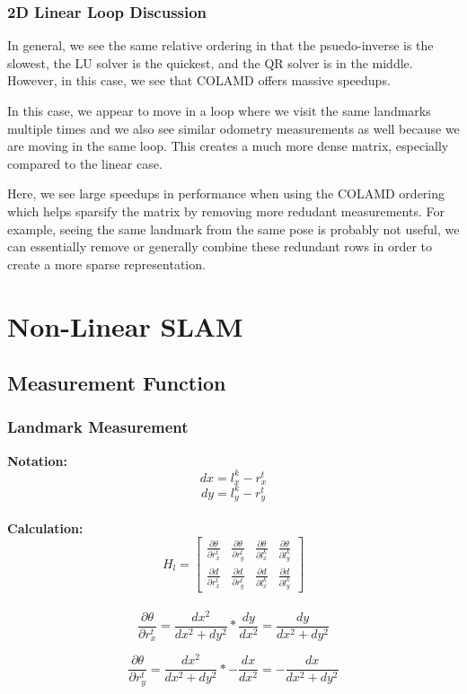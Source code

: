 \documentclass[12pt, a4paper]{article}
\begin{document}
\clearpage
\subsubsection{2D Linear Loop Discussion}
In general, we see the same relative ordering in that the psuedo-inverse is the slowest, the LU solver is the quickest, and the QR solver is in the middle. However, in this case, we see that COLAMD offers massive speedups.


In this case, we appear to move in a loop where we visit the same landmarks multiple times and we also see similar odometry measurements as well because we are moving in the same loop. This creates a much more dense matrix, especially compared to the linear case.

Here, we see large speedups in performance when using the COLAMD ordering which helps sparsify the matrix by removing more redudant measurements. For example, seeing the same landmark from the same pose is probably not useful, we can essentially remove or generally combine these redundant rows in order to create a more sparse representation. 

\section{Non-Linear SLAM}
\subsection{Measurement Function}
\subsubsection{Landmark Measurement}
\textbf{Notation:}
$$dx = l_x^k - r_x^t$$
$$dy = l_y^k - r_y^t$$
\\
\textbf{Calculation:}
$$H_{l} = \begin{bmatrix}
    \frac{\partial \theta}{\partial r^t_x} & \frac{\partial \theta}{\partial r^t_y}& \frac{\partial \theta}{\partial l_x^k} & \frac{\partial \theta}{\partial l_y^k} \\
    \frac{\partial d}{\partial r^t_x} & \frac{\partial d}{\partial r^t_y}& \frac{\partial d}{\partial l_x^k} & \frac{\partial d}{\partial l_y^k}
\end{bmatrix}$$
\\
$$\frac{\partial \theta}{\partial r_x^t} = \frac{dx^2}{dx^2 + dy^2} * \frac{dy}{dx^2} = \frac{dy}{dx^2 + dy^2}$$

$$\frac{\partial \theta}{\partial r_y^t} = \frac{dx^2}{dx^2 + dy^2} * -\frac{dx}{dx^2} = -\frac{dx}{dx^2 + dy^2}$$
\end{document}

